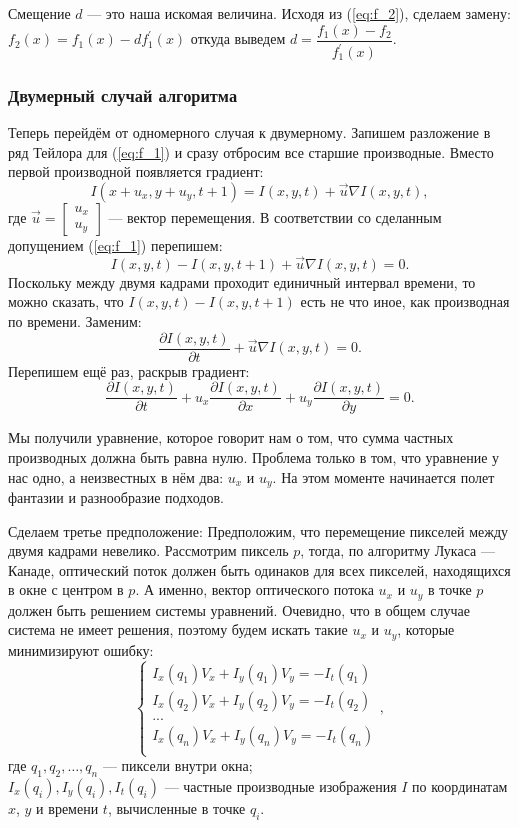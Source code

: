 Смещение $d$ — это наша искомая величина. Исходя из (\ref{eq:f_2}), сделаем замену:$f_2(x)=f_1(x)-df_1^{'}(x)$
откуда выведем $d = \dfrac{f_1(x)-f_2}{f_1^{'}(x)}.$
\subsubsection{Двумерный случай алгоритма}

Теперь перейдём от одномерного случая к двумерному. Запишем разложение в ряд Тейлора для (\ref{eq:f_1}) и сразу отбросим все старшие производные. Вместо первой производной появляется градиент:
$$I(x+u_x,y+u_y,t+1)=I(x,y,t)+\overrightarrow{u} \nabla I(x,y,t),$$
где $\overrightarrow{u} = \begin{bmatrix}u_x\\u_y
\end{bmatrix} $ — вектор перемещения.
В соответствии со сделанным допущением (\ref{eq:f_1}) перепишем:
$$I(x,y,t)-I(x,y,t+1) + \overrightarrow{u} \nabla I(x,y,t) = 0.$$
Поскольку между двумя кадрами проходит единичный интервал времени, то можно сказать, что $I(x,y,t)-I(x,y,t+1)$ есть не что иное, как производная по времени.
Заменим:
$$\frac{\partial I(x,y,t)}{\partial t} + \overrightarrow{u} \nabla I(x,y,t) = 0.$$
Перепишем ещё раз, раскрыв градиент:
$$\frac{\partial I(x,y,t)}{\partial t} + u_x\frac{\partial I(x,y,t)}{\partial x} + u_y\frac{\partial I(x,y,t)}{\partial y} = 0.$$

Мы получили уравнение, которое говорит нам о том, что сумма частных производных должна быть равна нулю. Проблема только в том, что уравнение у нас одно, а неизвестных в нём два: $u_x$ и $u_y$. На этом моменте начинается полет фантазии и разнообразие подходов.

Сделаем третье предположение: Предположим, что перемещение пикселей между двумя кадрами невелико. Рассмотрим пиксель $p$, тогда, по алгоритму Лукаса — Канаде, оптический поток должен быть одинаков для всех пикселей, находящихся в окне с центром в $p$. А именно, вектор оптического потока $u_x$ и $u_y$ в точке $p$ должен быть решением системы уравнений. Очевидно, что в общем случае система не имеет решения, поэтому будем искать такие $u_x$ и $u_y$, которые минимизируют ошибку:
$$
\begin{cases}
I_x(q_1) V_x + I_y (q_1) V_y = -I_t(q_1)\\
I_x(q_2) V_x + I_y (q_2) V_y = -I_t(q_2)\\
...\\
I_x(q_n) V_x + I_y (q_n) V_y = -I_t(q_n)\\
\end{cases},
$$
где $q_1,q_2,\dots,q_n$ — пиксели внутри окна;\\
$I_x(q_i),I_y(q_i),I_t(q_i)$ — частные производные изображения $I$ по координатам $x$, $y$ и времени $t$, вычисленные в точке $q_i$.

